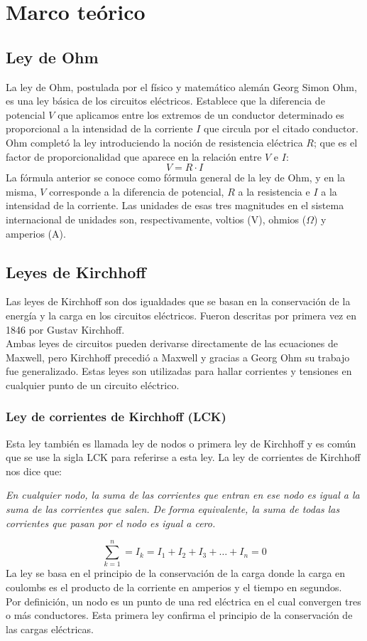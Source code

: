 \documentclass[a4paper,12pt]{report}
\begin{document}
\chapter{Marco teórico}
\section{Ley de Ohm}
La ley de Ohm, postulada por el físico y matemático alemán Georg Simon Ohm, es una ley básica de los circuitos eléctricos. Establece que la diferencia de potencial $V$ que aplicamos entre los extremos de un conductor determinado es proporcional a la intensidad de la corriente $I$ que circula por el citado conductor. Ohm completó la ley introduciendo la noción de resistencia eléctrica $R$; que es el factor de proporcionalidad que aparece en la relación entre $V$ e $I$:
\begin{equation}
V = R \cdot I
\end{equation}
La fórmula anterior se conoce como fórmula general de la ley de Ohm, y en la misma, $V$ corresponde a la diferencia de potencial, $R$ a la resistencia e $I$ a la intensidad de la corriente. Las unidades de esas tres magnitudes en el sistema internacional de unidades son, respectivamente, voltios (V), ohmios ($\Omega$) y amperios (A).
\section{Leyes de Kirchhoff}
Las leyes de Kirchhoff son dos igualdades que se basan en la conservación de la energía y la carga en los circuitos eléctricos. Fueron descritas por primera vez en 1846 por Gustav Kirchhoff.\\
Ambas leyes de circuitos pueden derivarse directamente de las ecuaciones de Maxwell, pero Kirchhoff precedió a Maxwell y gracias a Georg Ohm su trabajo fue generalizado. Estas leyes son utilizadas para hallar corrientes y tensiones en cualquier punto de un circuito eléctrico.
\subsection{Ley de corrientes de Kirchhoff (LCK)}
Esta ley también es llamada ley de nodos o primera ley de Kirchhoff y es común que se use la sigla LCK para referirse a esta ley. La ley de corrientes de Kirchhoff nos dice que:
\begin{center}
\textit{En cualquier nodo, la suma de las corrientes que entran en ese nodo es igual a la suma de las corrientes que salen. De forma equivalente, la suma de todas las corrientes que pasan por el nodo es igual a cero.}
\end{center}
\begin{equation}
\sum_{k=1}^{n} = I_{k} = I_{1} + I_{2} + I_{3} + \ldots + I_{n} = 0 
\end{equation}
La ley se basa en el principio de la conservación de la carga donde la carga en coulombs es el producto de la corriente en amperios y el tiempo en segundos.\\
Por definición, un nodo es un punto de una red eléctrica en el cual convergen tres o más conductores. Esta primera ley confirma el principio de la conservación de las cargas eléctricas.
\end{document}

